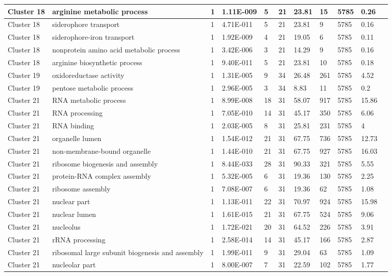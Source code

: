 \begin{tabular}{|l|l|l|l|l|l|l|l|l|l|l|}
\hline
Cluster 18&arginine metabolic process&1&1.11E-009&5&21&23.81&15&5785&0.26&\\
\hline
Cluster 18&siderophore transport&1&4.71E-011&5&21&23.81&9&5785&0.16&\\
\hline
Cluster 18&siderophore-iron transport&1&1.92E-009&4&21&19.05&6&5785&0.11&\\
\hline
Cluster 18&nonprotein amino acid metabolic process&1&3.42E-006&3&21&14.29&9&5785&0.16&\\
\hline
Cluster 18&arginine biosynthetic process&1&9.40E-011&5&21&23.81&10&5785&0.18&\\
\hline
Cluster 19&oxidoreductase activity&1&1.31E-005&9&34&26.48&261&5785&4.52&\\
\hline
Cluster 19&pentose metabolic process&1&2.96E-005&3&34&8.83&11&5785&0.2&\\
\hline
Cluster 21&RNA metabolic process&1&8.99E-008&18&31&58.07&917&5785&15.86&\\
\hline
Cluster 21&RNA processing&1&7.05E-010&14&31&45.17&350&5785&6.06&\\
\hline
Cluster 21&RNA binding&1&2.03E-005&8&31&25.81&231&5785&4&\\
\hline
Cluster 21&organelle lumen&1&1.54E-012&21&31&67.75&736&5785&12.73&\\
\hline
Cluster 21&non-membrane-bound organelle&1&1.44E-010&21&31&67.75&927&5785&16.03&\\
\hline
Cluster 21&ribosome biogenesis and assembly&1&8.44E-033&28&31&90.33&321&5785&5.55&\\
\hline
Cluster 21&protein-RNA complex assembly&1&5.32E-005&6&31&19.36&130&5785&2.25&\\
\hline
Cluster 21&ribosome assembly&1&7.08E-007&6&31&19.36&62&5785&1.08&\\
\hline
Cluster 21&nuclear part&1&1.13E-011&22&31&70.97&924&5785&15.98&\\
\hline
Cluster 21&nuclear lumen&1&1.61E-015&21&31&67.75&524&5785&9.06&\\
\hline
Cluster 21&nucleolus&1&1.72E-021&20&31&64.52&226&5785&3.91&\\
\hline
Cluster 21&rRNA processing&1&2.58E-014&14&31&45.17&166&5785&2.87&\\
\hline
Cluster 21&ribosomal large subunit biogenesis and assembly&1&1.99E-011&9&31&29.04&63&5785&1.09&\\
\hline
Cluster 21&nucleolar part&1&8.00E-007&7&31&22.59&102&5785&1.77&\\

\end{tabular}
